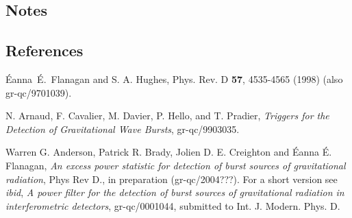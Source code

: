 \documentclass{article}
\begin{document}
\subsection{Notes}

\subsection{References}

\begin{thebibliography}{0}
\'Eanna~\'E.~Flanagan and S. A. Hughes, Phys. Rev. D {\bf 57},
4535-4565 (1998) (also gr-qc/9701039).  

N. Arnaud, F. Cavalier, M. Davier, P. Hello, and T. Pradier,
\textit{Triggers for the Detection of Gravitational Wave Bursts},
gr-qc/9903035.  

Warren G. Anderson, Patrick R. Brady, Jolien D. E. Creighton and 
{\'E}anna {\'E}. Flanagan, 
\textit{An excess power statistic for detection of burst sources of
gravitational radiation}, Phys Rev D., in preparation (gr-qc/2004???).
For a short version see {\it ibid}, \textit{A power filter for the
detection of burst sources of gravitational radiation in
interferometric detectors}, gr-qc/0001044, submitted to
Int. J. Modern. Phys. D. 


\end{thebibliography}
\end{document}
